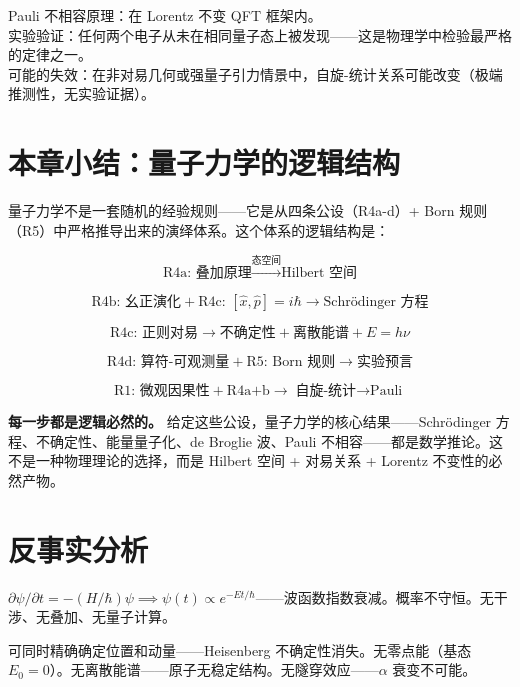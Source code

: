 \precisionbox[精度等级]
  Pauli 不相容原理：\precexact 在 Lorentz 不变 QFT 框架内。\\
  实验验证：任何两个电子从未在相同量子态上被发现——这是物理学中检验最严格的定律之一。\\
  可能的失效：在非对易几何或强量子引力情景中，自旋-统计关系可能改变（极端推测性，无实验证据）。
\endprecisionbox

\section{本章小结：量子力学的逻辑结构}

量子力学不是一套随机的经验规则——它是从四条公设（R4a-d）+ Born 规则（R5）中严格推导出来的演绎体系。这个体系的逻辑结构是：

\[
\boxed{\text{R4a: 叠加原理}} \xrightarrow{\text{态空间}} \boxed{\text{Hilbert 空间}}
\]

\[
\boxed{\text{R4b: 幺正演化}} + \boxed{\text{R4c: $[\hat{x},\hat{p}]=i\hbar$}} \longrightarrow \boxed{\text{Schr\"odinger 方程}}
\]

\[
\boxed{\text{R4c: 正则对易}} \longrightarrow \boxed{\text{不确定性} + \text{离散能谱} + E=h\nu}
\]

\[
\boxed{\text{R4d: 算符-可观测量}} + \boxed{\text{R5: Born 规则}} \longrightarrow \boxed{\text{实验预言}}
\]

\[
\boxed{\text{R1: 微观因果性}} + \boxed{\text{R4a+b}} \longrightarrow \boxed{\text{自旋-统计} \to \text{Pauli}}
\]

\textbf{每一步都是逻辑必然的。} 给定这些公设，量子力学的核心结果——Schr\"odinger 方程、不确定性、能量量子化、de Broglie 波、Pauli 不相容——都是数学推论。这不是一种物理理论的选择，而是 Hilbert 空间 + 对易关系 + Lorentz 不变性的必然产物。
\section*{反事实分析}

\begin{limitbox}[若无 $i$（退化为扩散方程）]
  $\partial\psi/\partial t = -(H/\hbar)\psi \implies \psi(t)\propto e^{-Et/\hbar}$——波函数指数衰减。概率不守恒。无干涉、无叠加、无量子计算。
\end{limitbox}

\begin{limitbox}
  可同时精确确定位置和动量——Heisenberg 不确定性消失。无零点能（基态 $E_0=0$）。无离散能谱——原子无稳定结构。无隧穿效应——$\alpha$ 衰变不可能。
\end{limitbox}

